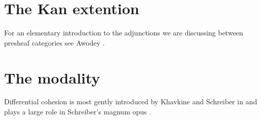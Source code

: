 \documentclass[12pt]{article}
\begin{document}
\section{The Kan extention}\label{sec:kan}
For an elementary introduction to the adjunctions we are discussing between presheaf categories see Awodey \cite{awodey_introduction_2010}.

\section{The modality}\label{sec:modality}
Differential cohesion is most gently introduced by Khavkine and Schreiber in \cite{khavkine_synthetic_2017} and plays a large role in Schreiber's magnum opus \cite{schreiber_differential_2013}.


 
\end{document}
